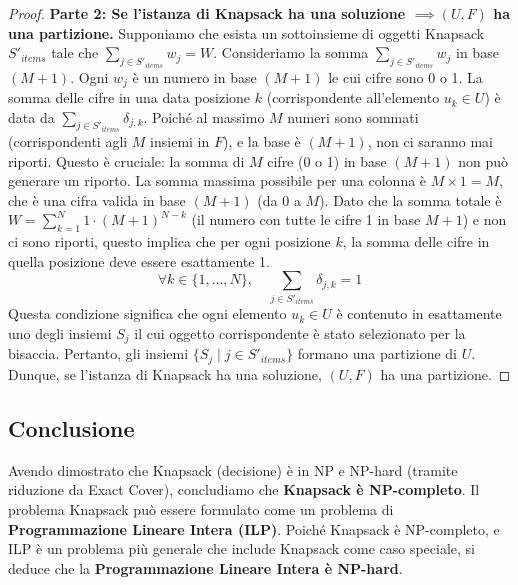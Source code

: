 \documentclass[a4paper]{article}
\theoremstyle{definition} %
\begin{document}
\begin{proof}
\textbf{Parte 2: Se l'istanza di Knapsack ha una soluzione $\implies (U, F)$ ha una partizione.}
Supponiamo che esista un sottoinsieme di oggetti Knapsack $S'_{items}$ tale che $\sum_{j \in S'_{items}} w_j = W$.
Consideriamo la somma $\sum_{j \in S'_{items}} w_j$ in base $(M+1)$. Ogni $w_j$ è un numero in base $(M+1)$ le cui cifre sono 0 o 1.
La somma delle cifre in una data posizione $k$ (corrispondente all'elemento $u_k \in U$) è data da $\sum_{j \in S'_{items}} \delta_{j,k}$. Poiché al massimo $M$ numeri sono sommati (corrispondenti agli $M$ insiemi in $F$), e la base è $(M+1)$, non ci saranno mai riporti. Questo è cruciale: la somma di $M$ cifre (0 o 1) in base $(M+1)$ non può generare un riporto. La somma massima possibile per una colonna è $M \times 1 = M$, che è una cifra valida in base $(M+1)$ (da 0 a $M$).
Dato che la somma totale è $W = \sum_{k=1}^N 1 \cdot (M+1)^{N-k}$ (il numero con tutte le cifre 1 in base $M+1$) e non ci sono riporti, questo implica che per ogni posizione $k$, la somma delle cifre in quella posizione deve essere esattamente 1.
\[ \forall k \in \{1, \ldots, N\}, \quad \sum_{j \in S'_{items}} \delta_{j,k} = 1 \]
Questa condizione significa che ogni elemento $u_k \in U$ è contenuto in esattamente uno degli insiemi $S_j$ il cui oggetto corrispondente è stato selezionato per la bisaccia.
Pertanto, gli insiemi $\{S_j \mid j \in S'_{items}\}$ formano una partizione di $U$.
Dunque, se l'istanza di Knapsack ha una soluzione, $(U, F)$ ha una partizione.
\end{proof}

\subsection{Conclusione}
Avendo dimostrato che Knapsack (decisione) è in NP e NP-hard (tramite riduzione da Exact Cover), concludiamo che \textbf{Knapsack è NP-completo}.
Il problema Knapsack può essere formulato come un problema di \textbf{Programmazione Lineare Intera (ILP)}. Poiché Knapsack è NP-completo, e ILP è un problema più generale che include Knapsack come caso speciale, si deduce che la \textbf{Programmazione Lineare Intera è NP-hard}.
\end{document}
